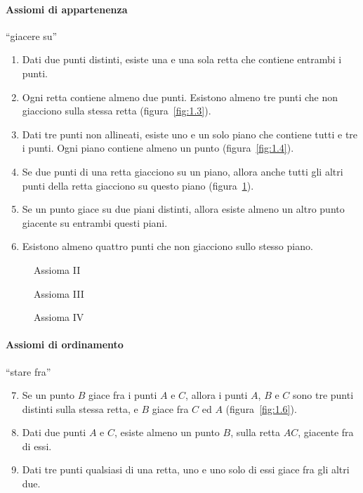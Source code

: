 \paragraph{Assiomi di appartenenza} ``giacere su''
\begin{enumerate}[label=\Roman{*}.]
\item Dati due punti distinti, esiste una e una sola retta che 
contiene entrambi i punti.
\item Ogni retta contiene almeno due punti. Esistono almeno tre punti 
che non giacciono sulla stessa retta (figura~\ref{fig:1.3}).
\item Dati tre punti non allineati, esiste uno e un solo piano che 
contiene tutti e tre i punti. Ogni piano contiene almeno un punto 
(figura~\ref{fig:1.4}).
\item Se due punti di una retta giacciono su un piano, allora anche 
tutti gli altri punti della retta giacciono su questo piano 
(figura~\ref{fig:1.5}).
\item Se un punto giace su due piani distinti, allora esiste almeno 
un altro punto giacente su entrambi questi piani.
\item Esistono almeno quattro punti che non giacciono sullo stesso 
piano.
\end{enumerate}


\begin{inaccessibleblock}
 \begin{figure}[bth]
 \begin{minipage}[b]{.32\textwidth}
 \centering
 
 \caption{Assioma II}\label{fig:1.3}
 \end{minipage}
 \begin{minipage}[b]{.32\textwidth}
 \centering
 
 \caption{Assioma III}\label{fig:1.4}
 \end{minipage}
 \begin{minipage}[b]{.32\textwidth}
 \centering
 
 \caption{Assioma IV}\label{fig:1.5}
 \end{minipage}
\end{figure}
\end{inaccessibleblock}

\paragraph{Assiomi di ordinamento} ``stare fra''
\begin{enumerate}[label=\Roman{*}.]
\setcounter{enumi}{6}
\item Se un punto $B$ giace fra i punti $A$ e $C$, allora i punti 
$A$, $B$ e $C$ sono tre punti distinti sulla stessa retta, e $B$ 
giace fra $C$ ed $A$ (figura~\ref{fig:1.6}).
\item Dati due punti $A$ e $C$, esiste almeno un punto $B$, sulla 
retta $AC$, giacente fra di essi.
\item Dati tre punti qualsiasi di una retta, uno e uno solo di essi 
giace fra gli altri due.
\end{enumerate}


